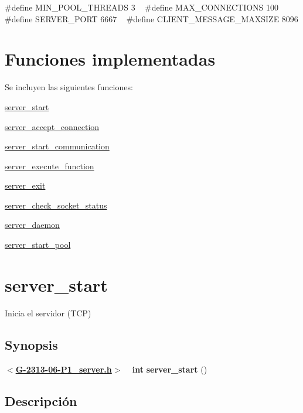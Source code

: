 {\ttfamily  \#define M\+I\+N\+\_\+\+P\+O\+O\+L\+\_\+\+T\+H\+R\+E\+A\+D\+S 3 ~\newline
\#define M\+A\+X\+\_\+\+C\+O\+N\+N\+E\+C\+T\+I\+O\+N\+S 100 ~\newline
\#define S\+E\+R\+V\+E\+R\+\_\+\+P\+O\+R\+T 6667 ~\newline
\#define C\+L\+I\+E\+N\+T\+\_\+\+M\+E\+S\+S\+A\+G\+E\+\_\+\+M\+A\+X\+S\+I\+Z\+E 8096 }\hypertarget{server_connection_functions}{}\section{Funciones implementadas}\label{server_connection_functions}
Se incluyen las siguientes funciones\+: 
\begin{DoxyItemize}
\item \hyperlink{server_start}{server\+\_\+start} 
\item \hyperlink{server_accept_connection}{server\+\_\+accept\+\_\+connection} 
\item \hyperlink{server_start_communication}{server\+\_\+start\+\_\+communication} 
\item \hyperlink{server_execute_function}{server\+\_\+execute\+\_\+function} 
\item \hyperlink{server_exit}{server\+\_\+exit} 
\item \hyperlink{server_check_socket_status}{server\+\_\+check\+\_\+socket\+\_\+status} 
\item \hyperlink{server_daemon}{server\+\_\+daemon} 
\item \hyperlink{server_start_pool}{server\+\_\+start\+\_\+pool} 
\end{DoxyItemize}\hypertarget{server_start}{}\section{server\+\_\+start}\label{server_start}
Inicia el servidor (T\+C\+P)\hypertarget{server_start_synopsis2}{}\subsection{Synopsis}\label{server_start_synopsis2}
{ {\bfseries $<$\hyperlink{G-2313-06-P1__server_8h}{G-\/2313-\/06-\/\+P1\+\_\+server.\+h}$>$} ~\newline
 {\bfseries int} {\bfseries server\+\_\+start} {\bfseries }() } \hypertarget{server_start_descripcion2}{}\subsection{Descripción}\label{server_start_descripcion2}
